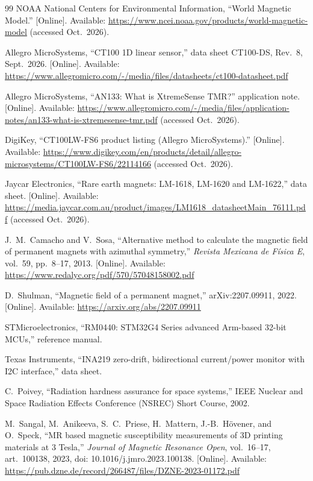 \documentclass[12pt,a4paper]{article}
\begin{document}
\begin{thebibliography}{99}
NOAA National Centers for Environmental Information, ``World Magnetic Model.'' [Online]. Available: \url{https://www.ncei.noaa.gov/products/world-magnetic-model} (accessed Oct.\ 2026).

Allegro MicroSystems, ``CT100 1D linear sensor,'' data sheet CT100-DS, Rev.~8, Sept.~2026. [Online]. Available: \url{https://www.allegromicro.com/-/media/files/datasheets/ct100-datasheet.pdf}

Allegro MicroSystems, ``AN133: What is XtremeSense TMR?'' application note. [Online]. Available: \url{https://www.allegromicro.com/-/media/files/application-notes/an133-what-is-xtremesense-tmr.pdf} (accessed Oct.\ 2026).

DigiKey, ``CT100LW-FS6 product listing (Allegro MicroSystems).'' [Online]. Available: \url{https://www.digikey.com/en/products/detail/allegro-microsystems/CT100LW-FS6/22114166} (accessed Oct.\ 2026).

Jaycar Electronics, ``Rare earth magnets: LM-1618, LM-1620 and LM-1622,'' data sheet. [Online]. Available: \url{https://media.jaycar.com.au/product/images/LM1618_datasheetMain_76111.pdf} (accessed Oct.\ 2026).

J.\ M.\ Camacho and V.\ Sosa, ``Alternative method to calculate the magnetic field of permanent magnets with azimuthal symmetry,'' \emph{Revista Mexicana de F\'isica E}, vol.~59, pp.~8--17, 2013. [Online]. Available: \url{https://www.redalyc.org/pdf/570/57048158002.pdf}

D.\ Shulman, ``Magnetic field of a permanent magnet,'' arXiv:2207.09911, 2022. [Online]. Available: \url{https://arxiv.org/abs/2207.09911}

STMicroelectronics, ``RM0440: STM32G4 Series advanced Arm-based 32-bit MCUs,'' reference manual.

Texas Instruments, ``INA219 zero-drift, bidirectional current/power monitor with I2C interface,'' data sheet.

C.\ Poivey, ``Radiation hardness assurance for space systems,'' IEEE Nuclear and Space Radiation Effects Conference (NSREC) Short Course, 2002.

M.\ Sangal, M.\ Anikeeva, S.\ C.\ Priese, H.\ Mattern, J.-B.\ H\"ovener, and O.\ Speck, ``MR based magnetic susceptibility measurements of 3D printing materials at 3 Tesla,'' \emph{Journal of Magnetic Resonance Open}, vol.~16--17, art.~100138, 2023, doi: 10.1016/j.jmro.2023.100138. [Online]. Available: \url{https://pub.dzne.de/record/266487/files/DZNE-2023-01172.pdf}


\end{thebibliography}
\end{document}
